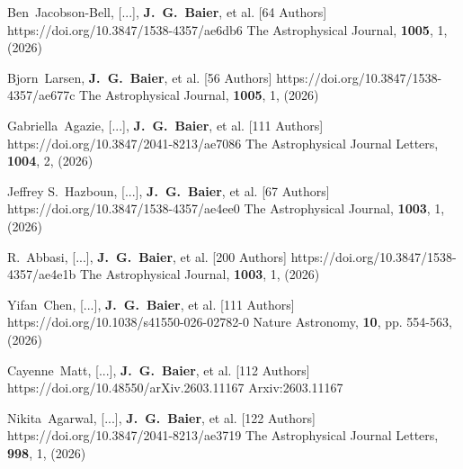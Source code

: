          {Ben~{Jacobson-Bell}, [...], \textbf{J.~G.~{Baier}}, et al. [64 Authors]}
         {https://doi.org/10.3847/1538-4357/ae6db6}
         {{The Astrophysical Journal}, \textbf{1005}, 1, (2026)}

         {Bjorn~{Larsen}, \textbf{J.~G.~{Baier}}, et al. [56 Authors]}
         {https://doi.org/10.3847/1538-4357/ae677c}
         {{The Astrophysical Journal}, \textbf{1005}, 1, (2026)}

         {Gabriella~{Agazie}, [...], \textbf{J.~G.~{Baier}}, et al. [111 Authors]}
         {https://doi.org/10.3847/2041-8213/ae7086}
         {{The Astrophysical Journal Letters}, \textbf{1004}, 2, (2026)}

         {Jeffrey S.~{Hazboun}, [...], \textbf{J.~G.~{Baier}}, et al. [67 Authors]}
         {https://doi.org/10.3847/1538-4357/ae4ee0}
         {{The Astrophysical Journal}, \textbf{1003}, 1, (2026)}

         {R.~{Abbasi}, [...], \textbf{J.~G.~{Baier}}, et al. [200 Authors]}
         {https://doi.org/10.3847/1538-4357/ae4e1b}
         {{The Astrophysical Journal}, \textbf{1003}, 1, (2026)}

         {Yifan~{Chen}, [...], \textbf{J.~G.~{Baier}}, et al. [111 Authors]}
         {https://doi.org/10.1038/s41550-026-02782-0}
         {{Nature Astronomy}, \textbf{10}, pp. 554-563, (2026)}

         {Cayenne~{Matt}, [...], \textbf{J.~G.~{Baier}}, et al. [112 Authors]}
         {https://doi.org/10.48550/arXiv.2603.11167}
         {{Arxiv:}2603.11167}

         {Nikita~{Agarwal}, [...], \textbf{J.~G.~{Baier}}, et al. [122 Authors]}
         {https://doi.org/10.3847/2041-8213/ae3719}
         {{The Astrophysical Journal Letters}, \textbf{998}, 1, (2026)}

